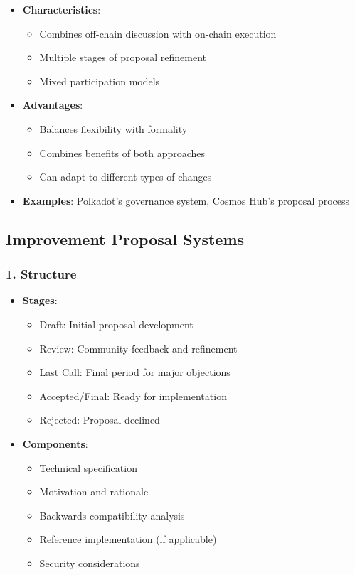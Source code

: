 \documentclass[
  letterpaper,
  DIV=11,
  numbers=noendperiod]{scrreprt}
\providecommand{\tightlist}{%
  \setlength{\itemsep}{0pt}\setlength{\parskip}{0pt}}\usepackage{longtable,booktabs,array}
\begin{document}
\begin{itemize}
\tightlist
\item
  \textbf{Characteristics}:

  \begin{itemize}
  \tightlist
  \item
    Combines off-chain discussion with on-chain execution
  \item
    Multiple stages of proposal refinement
  \item
    Mixed participation models
  \end{itemize}
\item
  \textbf{Advantages}:

  \begin{itemize}
  \tightlist
  \item
    Balances flexibility with formality
  \item
    Combines benefits of both approaches
  \item
    Can adapt to different types of changes
  \end{itemize}
\item
  \textbf{Examples}: Polkadot's governance system, Cosmos Hub's proposal
  process
\end{itemize}

\subsection{Improvement Proposal
Systems}\label{improvement-proposal-systems}

\subsubsection{1. Structure}\label{structure}

\begin{itemize}
\tightlist
\item
  \textbf{Stages}:

  \begin{itemize}
  \tightlist
  \item
    Draft: Initial proposal development
  \item
    Review: Community feedback and refinement
  \item
    Last Call: Final period for major objections
  \item
    Accepted/Final: Ready for implementation
  \item
    Rejected: Proposal declined
  \end{itemize}
\item
  \textbf{Components}:

  \begin{itemize}
  \tightlist
  \item
    Technical specification
  \item
    Motivation and rationale
  \item
    Backwards compatibility analysis
  \item
    Reference implementation (if applicable)
  \item
    Security considerations
  \end{itemize}
\end{itemize}
\end{document}
